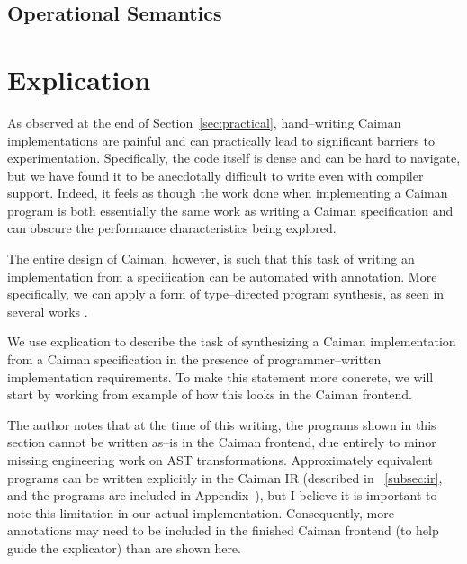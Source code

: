 \subsection{Operational Semantics}


\section{Explication}
\label{sec:explication}

As observed at the end of Section~\ref{sec:practical}, hand--writing Caiman implementations are painful and can practically lead to significant barriers to experimentation.  Specifically, the code itself is dense and can be hard to navigate, but we have found it to be anecdotally difficult to write even with compiler support.  Indeed, it feels as though the work done when implementing a Caiman program is both essentially the same work as writing a Caiman specification and can obscure the performance characteristics being explored.

The entire design of Caiman, however, is such that this task of writing an implementation from a specification can be automated with annotation.  More specifically, we can apply a form of type--directed program synthesis, as seen in several works .

We use explication to describe the task of synthesizing a Caiman implementation from a Caiman specification in the presence of programmer--written implementation requirements.  To make this statement more concrete, we will start by working from example of how this looks in the Caiman frontend.

The author notes that at the time of this writing, the programs shown in this section cannot be written as--is in the Caiman frontend, due entirely to minor missing engineering work on AST transformations.  Approximately equivalent programs can be written explicitly in the Caiman IR (described in ~\ref{subsec:ir}, and the programs are included in Appendix~), but I believe it is important to note this limitation in our actual implementation.  Consequently, more annotations may need to be included in the finished Caiman frontend (to help guide the explicator) than are shown here.

